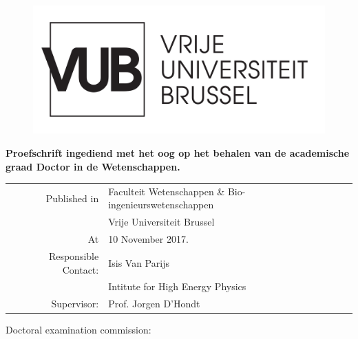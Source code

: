 
\begin{center}
	\vspace*{5mm}
     
    \begin{figure}[ht]
    	\centering
    	\includegraphics[width=0.5\linewidth]{"VUB MONO positief/VUB MONO POSITIEF OUTLINE"}
    	\label{fig:vub-mono-positief-outline}
    \end{figure}
    
	\huge \textbf{\Title}

	\vspace{10mm}

	\Large \Author
	
	\vspace{10mm}
	\large \textbf{Proefschrift ingediend met het oog op het behalen van de academische graad Doctor in de Wetenschappen.}

	\vspace{10mm}
	\small
	\begin{tabular}{rl}
     Published in & Faculteit Wetenschappen \& Bio-ingenieurswetenschappen \\[2mm]
                  &\large Vrije Universiteit Brussel \\[2mm]
               At & \large 10 November 2017.\\[10mm]
   Responsible Contact: & \large Isis Van Parijs \\[1mm]
                  & Intitute for High Energy Physics\\
                  Supervisor: & Prof. Jorgen D'Hondt
	\end{tabular}


\end{center}

\thispagestyle{empty}
\newpage
\null

Doctoral examination commission:\\


